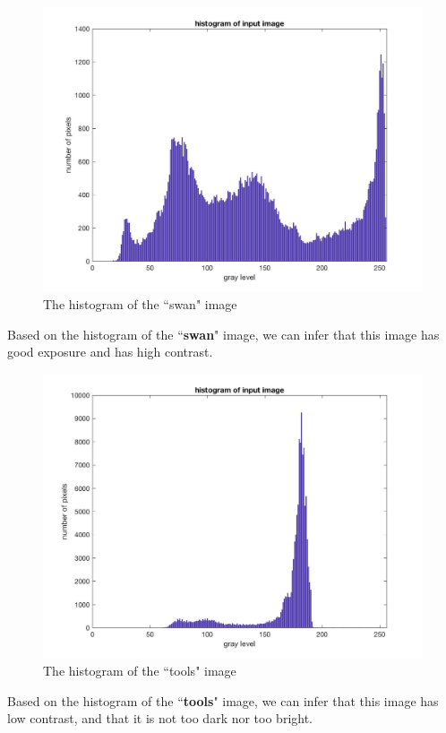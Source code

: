 \documentclass[a4paper]{article}
\begin{document}
\begin{spacing}{2.0}
\begin{enumerate}
		\begin{figure}[H]
		    \centering
	    	    \includegraphics[width=4.5in]{2.jpg}
		    \caption{The histogram of the ``swan" image} 
	    	\end{figure}
	Based on the histogram of the ``\textbf{swan}" image, we can infer that this image has good exposure and has high contrast.
		
		\begin{figure}[H]
		    \centering
	    	    \includegraphics[width=4.5in]{3.jpg}
		    \caption{The histogram of the ``tools" image} 
	    	\end{figure}
	Based on the histogram of the ``\textbf{tools}" image, we can infer that this image has low contrast, and that it is not too dark nor too bright.\\
	

\end{enumerate}
\end{spacing}
\end{document}
